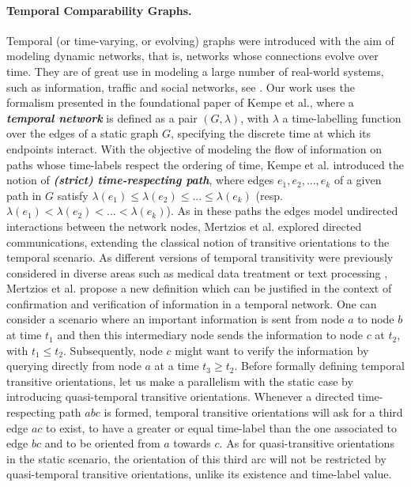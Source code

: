 \documentclass[runningheads]{llncs}
\newcommand{\bfit}[1]{\textbf{\textit{#1}}}
\begin{document}
\paragraph*{Temporal Comparability Graphs.}
Temporal (or time-varying, or evolving) graphs were introduced with the aim of modeling dynamic networks, that is, networks whose connections evolve over time. They are of great use in modeling a large number of real-world systems, such as information, traffic and social networks, see \cite{casteigts2012time, latapy2018stream}. Our work uses the formalism presented in the foundational paper of Kempe et al.\cite{kempe2000connectivity}, where a \bfit{temporal network} is defined as a pair $(G,\lambda)$, with $\lambda$ a time-labelling function over the edges of a static graph $G$, specifying the discrete time at which its endpoints interact. With the objective of modeling the flow of information on paths whose time-labels respect the ordering of time, Kempe et al. introduced the notion of \bfit{(strict) time-respecting path}, where edges $e_1, e_2, ..., e_k$ of a given path in $G$ satisfy $\lambda(e_1) \leq \lambda(e_2) \leq ... \leq \lambda(e_k)$ (resp. $\lambda(e_1) < \lambda(e_2) < ... < \lambda(e_k)$). As in these paths the edges model undirected interactions between the network nodes, Mertzios et al.\cite{mertzios2025complexity} explored directed communications, extending the classical notion of transitive orientations to the temporal scenario. As different versions of temporal transitivity were previously considered in diverse areas such as medical data treatment \cite{moskovitch2015fast} or text processing \cite{tannier2011evaluating}, Mertzios et al. propose a new definition which can be justified in the context of confirmation and verification of information in a temporal network. One can consider a scenario where an important information is sent from node $a$ to node $b$ at time $t_1$ and then this intermediary node sends the information to node $c$ at $t_2$, with $t_1 \leq t_2$. Subsequently, node $c$ might want to verify the information by querying directly from node $a$ at a time $t_3 \geq t_2$. Before formally defining temporal transitive orientations, let us make a parallelism with the static case by introducing quasi-temporal transitive orientations. Whenever a directed time-respecting path $abc$ is formed, temporal transitive orientations will ask for a third edge $ac$ to exist, to have a greater or equal time-label than the one associated to edge $bc$ and to be oriented from $a$ towards $c$. As for quasi-transitive orientations in the static scenario, the orientation of this third arc will not be restricted by quasi-temporal transitive orientations, unlike its existence and time-label value. 
\end{document}
